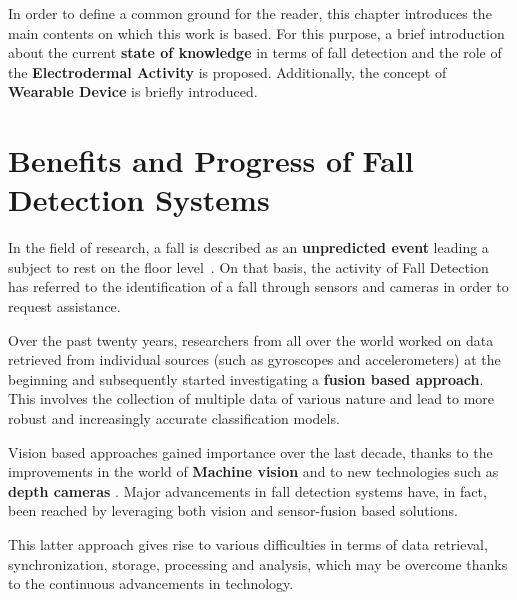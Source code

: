 \label{ch:background}

In order to define a common ground for the reader, this chapter introduces the main contents on which this work is based. For this purpose, a brief introduction about the current \textbf{state of knowledge} in terms of fall detection and the role of the \textbf{Electrodermal Activity} is proposed. Additionally, the concept of \textbf{Wearable Device} is briefly introduced.

\section{Benefits and Progress of Fall Detection Systems }\label{sec:fallintro}

In the field of research, a fall is described as an \textbf{unpredicted event} leading a subject to rest on the floor level~\cite{Lamb1}. On that basis, the activity of Fall Detection has referred to the identification of a fall through sensors and cameras in order to request assistance.

Over the past twenty years, researchers from all over the world worked on data retrieved from individual sources (such as gyroscopes and accelerometers) at the beginning and subsequently started investigating a \textbf{fusion based approach}. This involves the collection of multiple data of various nature and lead to more robust and increasingly accurate classification models. 

Vision based approaches gained importance over the last decade, thanks to the improvements in the world of \textbf{Machine vision} and to new technologies such as \textbf{depth cameras} \cite{elderlySurvey}. Major advancements in fall detection systems have, in fact, been reached by leveraging both vision and sensor-fusion based solutions. 

This latter approach gives rise to various difficulties in terms of data retrieval, synchronization, storage, processing and analysis, which may be overcome thanks to the continuous advancements in technology.


